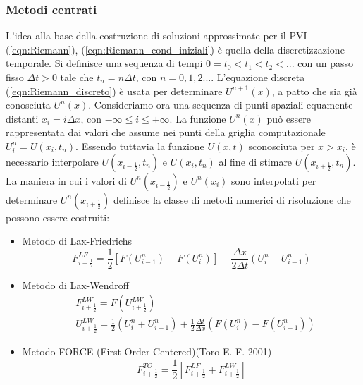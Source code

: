 \documentclass[12pt]{article} %
\begin{document}
\subsubsection{Metodi centrati}
\noindent L'idea alla base della costruzione di soluzioni approssimate per il PVI (\ref{eqn:Riemann}), (\ref{eqn:Riemann_cond_iniziali}) è quella della discretizzazione temporale. Si definisce una sequenza di tempi $0=t_0<t_1<t_2<...$ con un passo fisso $\Delta t>0$ tale che $t_n=n\Delta t$, con $n=0,1,2...$. L'equazione discreta (\ref{eqn:Riemann_discreto}) è usata per determinare  $U^{n+1}(x)$, a patto che sia già conosciuta  $U^{n}(x)$. Consideriamo ora una sequenza di punti spaziali equamente distanti $x_i=i\Delta x$, con $-\infty\leq i \leq+\infty$. La funzione $U^{n}(x)$ può essere rappresentata dai valori che assume nei punti della griglia computazionale $U_i^{n}=U(x_i,t_n)$. Essendo tuttavia la funzione $U(x,t)$ sconosciuta per $x > x_i$, è necessario interpolare $U\left(x_{i-\frac{1}{2}},t_n\right)$ e $U(x_i,t_n)$ al fine di stimare $U\left(x_{i+\frac{1}{2}},t_n\right)$. La maniera in cui i valori di $U^n\left(x_{i-\frac{1}{2}}\right)$ e $U^n(x_i)$ sono interpolati per determinare $U^n\left(x_{i+\frac{1}{2}}\right)$ definisce la classe di metodi numerici di risoluzione che possono essere costruiti:
\begin{itemize}
    \item Metodo di Lax-Friedrichs
    \begin{equation}
        F_{i+\frac{1}{2}}^{LF}=\frac{1}{2}\left[F(U_{i-1}^n)+F(U_i^n)\right]-\frac{\Delta x}{2\Delta t}(U_i^n-U_{i-1}^n)
        \label{eqn:Lax-Friedrichs}
    \end{equation}
    \item Metodo di Lax-Wendroff
        \begin{equation}
        \begin{split}
           &F_{i+\frac{1}{2}}^{LW}=F(U_{i+\frac{1}{2}}^{LW}) \\
           &U_{i+\frac{1}{2}}^{LW}=\frac{1}{2}\left(U_i^n+U_{i+1}^n\right)+\frac{1}{2}\frac{\Delta t}{\Delta x}\left(F(U_i^n)-F(U_{i+1}^n)\right)
        \end{split}
        \label{eqn:Lax-Wendroff}
    \end{equation}
    \item Metodo FORCE (First Order Centered)(Toro E. F. 2001)
    \begin{equation}
        F_{i+\frac{1}{2}}^{TO}=\frac{1}{2}\left[F_{i+\frac{1}{2}}^{LF}+F_{i+\frac{1}{2}}^{LW}\right]
        \label{eqn:FORCE}
        \end{equation}
\end{itemize}
\end{document}
